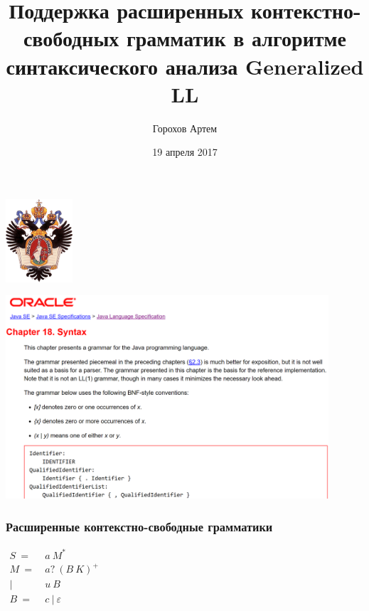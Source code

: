 \documentclass{beamer}
\title[]{Поддержка расширенных контекстно-свободных грамматик в алгоритме синтаксического анализа Generalized LL}
\institute[СПбГУ]{ Санкт-Петербургский Государственный Университет }
\author[Горохов Артем]{Горохов Артем}
\date{19 апреля 2017}
\begin{document}
 
	
	\begin{frame}
		\begin{center} 
			{\includegraphics[width=2.5cm]{pictures/SPbGU_Logo.png}} 
		\end{center}
		\titlepage
	\end{frame}

	\begin{frame}
		\begin{center} 
			{\includegraphics[width=12cm]{pictures/java_grammar.png}} 
		\end{center}
	\end{frame}

	\begin{frame} 
		\frametitle{Расширенные контекстно-свободные грамматики}
		\begin{center}
			{$\begin{aligned}
				S\ =&\ a\ M^* \\
				M\ =&\ a?\ (B\ K)^+ \\
				|&\ u\ B \\
				B\ =&\ c\ |\ \varepsilon
				\end{aligned}$}
		\end{center}
	\end{frame}
	
\end{document}

